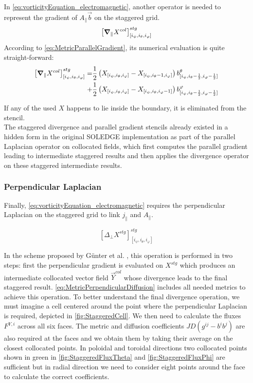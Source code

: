 In \autoref{eq:vorticityEquation_electromagnetic}, another operator is needed to represent the gradient of $A_\parallel \vec{b}$ on the staggered grid.
$$\left[\grad_\parallel X^{col}\right]^{stg}_{[i_\psi,i_\theta, i_\varphi]}$$
According to \autoref{eq:MetricParallelGradient}, its numerical evaluation is quite straight-forward: 
\begin{align}
	\label{eq:NumericalStaggeredParallelGradientStencil}
	\left[\grad_\parallel X^{col}\right]^{stg}_{[i_\psi,i_\theta, i_\varphi]} =& \frac{1}{2}\left(X_{[i_\psi,i_\theta, i_\varphi]}-X_{[i_\psi,i_\theta-1, i_\varphi]}\right)b_{[i_\psi,i_\theta-\frac{1}{2}, i_\varphi-\frac{1}{2}]}^\theta \nonumber \\ +& 
	\frac{1}{2}\left(X_{[i_\psi,i_\theta, i_\varphi]}-X_{[i_\psi,i_\theta, i_\varphi-1]}\right)b_{[i_\psi,i_\theta-\frac{1}{2}, i_\varphi-\frac{1}{2}]}^\varphi
\end{align}

If any of the used $X$ happens to lie inside the boundary, it is eliminated from the stencil. \\

The staggered divergence and parallel gradient stencils already existed in a hidden form in the original SOLEDGE implementation as part of the parallel Laplacian operator on collocated fields, which first computes the parallel gradient leading to intermediate staggered results and then applies the divergence operator on these staggered intermediate results.

\subsubsection{Perpendicular Laplacian}

Finally, \autoref{eq:vorticityEquation_electromagnetic} requires the perpendicular Laplacian on the staggered grid to link $j_\parallel$ and $A_\parallel$.

$$\left[\Delta_{\perp}X^{stg}\right]^{stg}_{[i_\psi,i_\theta, i_\varphi]}$$

In the scheme proposed by G\"{u}nter et al. \cite{Gnter2005ModellingOH}, this operation is performed in two steps: first the perpendicular gradient is evaluated on $X^{stg}$ which produces an intermediate collocated vector field $\vec{Y}^{col}$ whose divergence leads to the final staggered result. \autoref{eq:MetricPerpendicularDiffusion} includes all needed metrics to achieve this operation. To better understand the final divergence operation, we must imagine a cell centered around the point where the perpendicular Laplacian is required, depicted in \autoref{fig:StaggeredCell}. We then need to calculate the fluxes $F^{Y,i}$ across all six faces. The metric and diffusion coefficients $JD(g^{ij}-b^ib^j)$ are also required at the faces and we obtain them by taking their average on the closest collocated points. In poloidal and toroidal directions two collocated points shown in green in \autoref{fig:StaggeredFluxTheta} and \autoref{fig:StaggeredFluxPhi} are sufficient but in radial direction we need to consider eight points around the face to calculate the correct coefficients. \\

